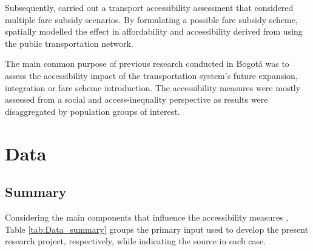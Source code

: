 \documentclass[12pt, a4paper]{report}
\begin{document}
Subsequently, \cite{guzmanAccessibilityAffordabilityEquity2018} carried out a transport accessibility assessment that considered multiple fare subsidy scenarios. By formulating a possible fare subsidy scheme, \cite{guzmanAccessibilityAffordabilityEquity2018} spatially modelled the effect in affordability and accessibility derived from using the public transportation network.

The main common purpose of previous research conducted in Bogotá was to assess the accessibility impact of the transportation system's future expansion, integration or fare scheme introduction. The accessibility measures were mostly assessed from a social and access-inequality perspective as results were disaggregated by population groups of interest.



\chapter{Data} \label{Chap3}


\section{Summary}

Considering the main components that influence the accessibility measures \citep{pereiraIntroductionUrbanAccessibility2023a}, Table \ref{tab:Data_summary} groups the primary input used to develop the present research project, respectively, while indicating the source in each case.
\end{document}
